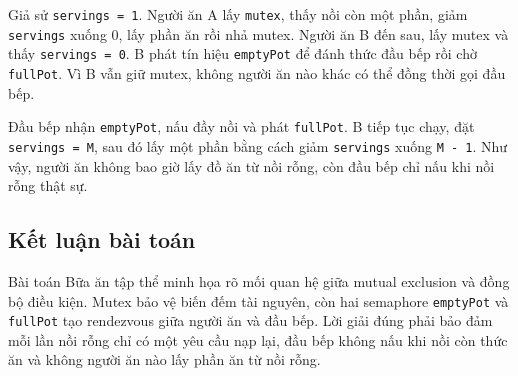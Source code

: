 Giả sử \texttt{servings = 1}. Người ăn A lấy \texttt{mutex}, thấy nồi còn một
phần, giảm \texttt{servings} xuống 0, lấy phần ăn rồi nhả mutex. Người ăn B đến
sau, lấy mutex và thấy \texttt{servings = 0}. B phát tín hiệu
\texttt{emptyPot} để đánh thức đầu bếp rồi chờ \texttt{fullPot}. Vì B vẫn giữ
mutex, không người ăn nào khác có thể đồng thời gọi đầu bếp.

Đầu bếp nhận \texttt{emptyPot}, nấu đầy nồi và phát \texttt{fullPot}. B tiếp
tục chạy, đặt \texttt{servings = M}, sau đó lấy một phần bằng cách giảm
\texttt{servings} xuống \texttt{M - 1}. Như vậy, người ăn không bao giờ lấy đồ
ăn từ nồi rỗng, còn đầu bếp chỉ nấu khi nồi rỗng thật sự.

\subsection{Kết luận bài toán}

Bài toán Bữa ăn tập thể minh họa rõ mối quan hệ giữa mutual exclusion và đồng
bộ điều kiện. Mutex bảo vệ biến đếm tài nguyên, còn hai semaphore
\texttt{emptyPot} và \texttt{fullPot} tạo rendezvous giữa người ăn và đầu bếp.
Lời giải đúng phải bảo đảm mỗi lần nồi rỗng chỉ có một yêu cầu nạp lại, đầu bếp
không nấu khi nồi còn thức ăn và không người ăn nào lấy phần ăn từ nồi rỗng.
